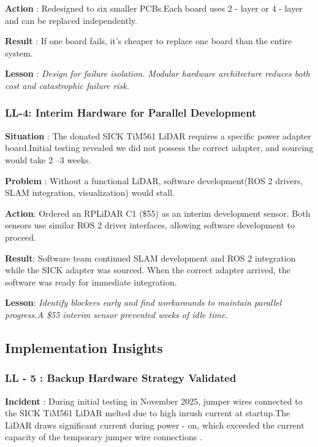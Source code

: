 \textbf{Action} : Redesigned to six smaller PCBs.Each board uses 2 - layer or
        4 - layer and can be replaced independently.

\textbf{Result} : If one board fails,
    it's cheaper to replace one board than the entire system.

\textbf{Lesson} : \textit {Design for failure isolation. Modular hardware architecture reduces both cost and catastrophic failure risk.
}

\subsubsection {LL-4: Interim Hardware for Parallel Development
}

\textbf{Situation}
    : The donated SICK TiM561 LiDAR
        requires a
      specific power adapter board.Initial testing revealed we did not possess
          the correct adapter,
      and sourcing would take 2 --3 weeks.

\textbf{Problem} : Without a functional LiDAR,
      software
      development(ROS 2 drivers, SLAM integration, visualization) would stall.

\textbf{Action}: Ordered an RPLiDAR C1 (\$55) as an interim development sensor. Both sensors use similar ROS 2 driver interfaces, allowing software development to proceed.

\textbf{Result}: Software team continued SLAM development and ROS 2 integration while the SICK adapter was sourced. When the correct adapter arrived, the software was ready for immediate integration.

\textbf{Lesson}: \textit{
  Identify blockers early and find workarounds to maintain parallel
      progress.A \$55 interim sensor prevented weeks of idle time.
}

\subsection { Implementation Insights }

\subsubsection { LL - 5 : Backup Hardware Strategy Validated }

\textbf{Incident}
    : During initial testing in November 2025,
      jumper wires connected to the SICK TiM561 LiDAR melted due to high inrush
              current at startup.The
                  LiDAR draws significant current during power -
          on,
      which exceeded the current capacity of the temporary jumper wire
              connections
                  .

